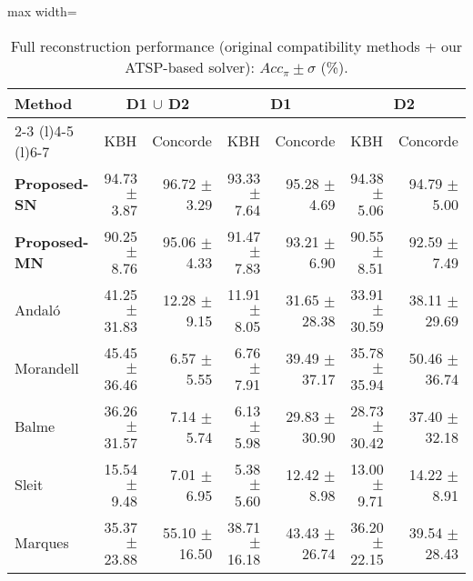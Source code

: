 
\begin{table*}[htb]
   \centering
   \caption{Full reconstruction performance (original compatibility methods + our ATSP-based solver): $Acc_\pi \pm \sigma $ (\%).}
   \label{tab:rec}
   \begin{adjustbox}{max width=\textwidth}
      \begin{tabular}{lrrrrrr}
         \toprule
         \multirow{3}{*}{\textbf{Method}} & \multicolumn{2}{c}{D1 $\cup$ D2} & \multicolumn{2}{c}{D1} & \multicolumn{2}{c}{D2}\\
         \cmidrule(l){2-3}  \cmidrule(l){4-5}  \cmidrule(l){6-7}
         & \multicolumn{1}{c}{KBH} & \multicolumn{1}{c}{Concorde} & \multicolumn{1}{c}{KBH} & \multicolumn{1}{c}{Concorde} & \multicolumn{1}{c}{KBH} & \multicolumn{1}{c}{Concorde} \\
         \midrule
         \textbf{Proposed-SN} & 94.73 $\pm$ 3.87 & 96.72 $\pm$ 3.29 & 93.33 $\pm$ 7.64 & 95.28 $\pm$ 4.69 & 94.38 $\pm$ 5.06 & 94.79 $\pm$ 5.00\\
         \textbf{Proposed-MN} & 90.25 $\pm$ 8.76 & 95.06 $\pm$ 4.33 & 91.47 $\pm$ 7.83 & 93.21 $\pm$ 6.90 & 90.55 $\pm$ 8.51 & 92.59 $\pm$ 7.49\\
         Andaló & 41.25 $\pm$ 31.83 & 12.28 $\pm$ 9.15 & 11.91 $\pm$ 8.05 & 31.65 $\pm$ 28.38 & 33.91 $\pm$ 30.59 & 38.11 $\pm$ 29.69\\
         Morandell & 45.45 $\pm$ 36.46 & 6.57 $\pm$ 5.55 & 6.76 $\pm$ 7.91 & 39.49 $\pm$ 37.17 & 35.78 $\pm$ 35.94 & 50.46 $\pm$ 36.74\\
         Balme & 36.26 $\pm$ 31.57 & 7.14 $\pm$ 5.74 & 6.13 $\pm$ 5.98 & 29.83 $\pm$ 30.90 & 28.73 $\pm$ 30.42 & 37.40 $\pm$ 32.18\\
         Sleit & 15.54 $\pm$ 9.48 & 7.01 $\pm$ 6.95 & 5.38 $\pm$ 5.60 & 12.42 $\pm$ 8.98 & 13.00 $\pm$ 9.71 & 14.22 $\pm$ 8.91\\
         Marques & 35.37 $\pm$ 23.88 & 55.10 $\pm$ 16.50 & 38.71 $\pm$ 16.18 & 43.43 $\pm$ 26.74 & 36.20 $\pm$ 22.15 & 39.54 $\pm$ 28.43\\
         \bottomrule
      \end{tabular}
    \end{adjustbox}
\end{table*}
